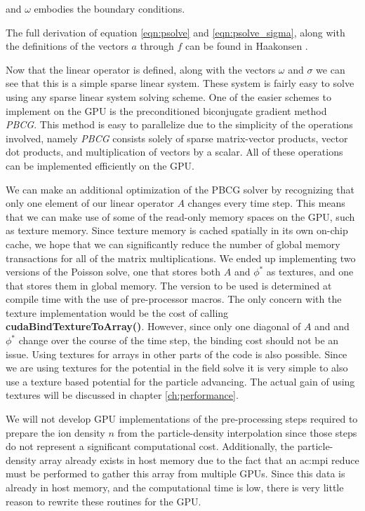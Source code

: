 and $\omega$ embodies the boundary conditions. 

The full derivation of equation \ref{eqn:psolve} and \ref{eqn:psolve_sigma}, along with the definitions of the vectors $a$ through $f$ can be found in Haakonsen \cite{Haakonsen2011}.

Now that the linear operator is defined, along with the vectors $\omega$ and $\sigma$ we can see that this is a simple sparse linear system. These system is fairly easy to solve using any sparse linear system solving scheme. One of the easier schemes to implement on the GPU is the preconditioned biconjugate gradient method \emph{PBCG}. This method is easy to parallelize due to the simplicity of the operations involved, namely \emph{PBCG} consists solely of sparse matrix-vector products, vector dot products, and multiplication of vectors by a scalar. All of these operations can be implemented efficiently on the GPU. 

We can make an additional optimization of the PBCG solver by recognizing that only one element of our linear operator $A$ changes every time step. This means that we can make use of some of the read-only memory spaces on the GPU, such as texture memory. Since texture memory is cached spatially in its own on-chip cache, we hope that we can significantly reduce the number of global memory transactions for all of the matrix multiplications. We ended up implementing two versions of the Poisson solve, one that stores both $A$ and $\phi^*$ as textures, and one that stores them in global memory. The version to be used is determined at compile time with the use of pre-processor macros. 
The only concern with the texture implementation would be the cost of calling \textbf{cudaBindTextureToArray()}. However, since only one diagonal of $A$ and and $\phi^*$ change over the course of the time step, the binding cost should not be an issue. Using textures for arrays in other parts of the code is also possible. Since we are using textures for the potential in the field solve it is very simple to also use a texture based potential for the particle advancing. The actual gain of using textures will be discussed in chapter \ref{ch:performance}.

We will not develop GPU implementations of the pre-processing steps required to prepare the ion density $n$ from the particle-density interpolation since those steps do not represent a significant computational cost. Additionally, the particle-density array already exists in host memory due to the fact that an \gls{ac:mpi} reduce must be performed to gather this array from multiple GPUs. Since this data is already in host memory, and the computational time is low, there is very little reason to rewrite these routines for the GPU.  


